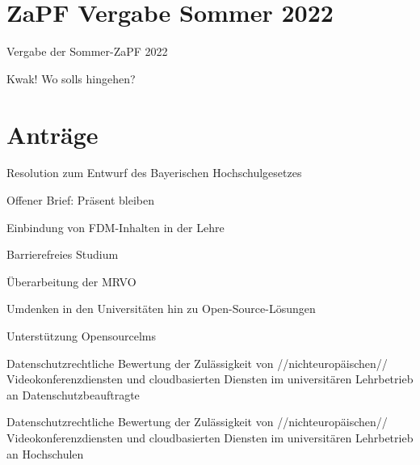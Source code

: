 \documentclass[compress, aspectratio=169]{beamer}
\begin{document}
\section{ZaPF Vergabe Sommer 2022}

\begin{frame}{Vergabe der Sommer-ZaPF 2022}
\centering

\vspace{.5cm}
\huge Kwak! Wo solls hingehen?
\end{frame}

\section{Anträge}

\begin{frame}
\centering
\huge Resolution zum Entwurf des Bayerischen Hochschulgesetzes
\end{frame}

\begin{frame}
\centering
\huge Offener Brief: Präsent bleiben
\end{frame}

\begin{frame}
\centering
\huge Einbindung von FDM-Inhalten in der Lehre
\end{frame}

\begin{frame}
\centering
\huge Barrierefreies Studium
\end{frame}

\begin{frame}
\centering
\huge Überarbeitung der MRVO
\end{frame}

\begin{frame}
\centering
\huge Umdenken in den Universitäten hin zu Open-Source-Lösungen
\end{frame}

\begin{frame}
\centering
\huge Unterstützung Opensourcelms
\end{frame}

\begin{frame}
\centering
\Large Datenschutzrechtliche Bewertung der Zulässigkeit von //nichteuropäischen// Videokonferenzdiensten und cloudbasierten Diensten im universitären Lehrbetrieb an Datenschutzbeauftragte
\end{frame}

\begin{frame}
\centering
\Large Datenschutzrechtliche Bewertung der Zulässigkeit von //nichteuropäischen// Videokonferenzdiensten und cloudbasierten Diensten im universitären Lehrbetrieb an Hochschulen
\end{frame}
\end{document}
